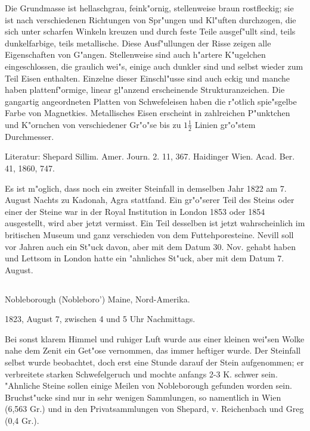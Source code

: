 \documentclass[a4paper, 11pt, oneside]{article}
\begin{document}
Die Grundmasse ist hellaschgrau, feink"ornig, stellenweise braun rostfleckig; sie ist nach verschiedenen Richtungen von Spr"ungen und Kl"uften durchzogen, die sich unter scharfen Winkeln kreuzen und durch feste Teile ausgef"ullt sind, teils dunkelfarbige, teils metallische. Diese Ausf"ullungen der Risse zeigen alle Eigenschaften von G"angen. Stellenweise sind auch h"artere K"ugelchen eingeschlossen, die graulich wei"s, einige auch dunkler sind und selbst wieder zum Teil Eisen enthalten. Einzelne dieser Einschl"usse sind auch eckig und manche haben plattenf"ormige, linear gl"anzend erscheinende Strukturanzeichen. Die gangartig angeordneten Platten von Schwefeleisen haben die r"otlich spie"sgelbe Farbe von Magnetkies. Metallisches Eisen erscheint in zahlreichen P"unktchen und K"ornchen von verschiedener Gr"o"se bis zu $\mathfrak{1\frac{1}{2}}$ Linien gr"o"stem Durchmesser.

\normalsize
Literatur: Shepard Sillim. Amer. Journ. 2. 11, 367. Haidinger Wien. Acad. Ber. 41, 1860, 747.

\LARGE
Es ist m"oglich, dass noch ein zweiter Steinfall in demselben Jahr 1822 am 7. August Nachts zu Kadonah, Agra stattfand. Ein gr"o"serer Teil des Steins oder einer der Steine war in der Royal Institution in London 1853 oder 1854 ausgestellt, wird aber jetzt vermisst. Ein Teil desselben ist jetzt wahrscheinlich im britischen Museum und ganz verschieden von dem Futtehporesteine. Nevill soll vor Jahren auch ein St"uck davon, aber mit dem Datum 30. Nov. gehabt haben und Lettsom in London hatte ein "ahnliches St"uck, aber mit dem Datum 7. August.
\subsection{}
\LARGE
\paragraph{}
Nobleborough (Nobleboro') Maine, Nord-Amerika.

1823, August 7, zwischen 4 und 5 Uhr Nachmittags.

Bei sonst klarem Himmel und ruhiger Luft wurde aus einer kleinen wei"sen Wolke nahe dem Zenit ein Get"ose vernommen, das immer heftiger wurde. Der Steinfall selbst wurde beobachtet, doch erst eine Stunde darauf der Stein aufgenommen; er verbreitete starken Schwefelgeruch und mochte anfangs 2-3 K. schwer sein. "Ahnliche Steine sollen einige Meilen von Nobleborough gefunden worden sein. Bruchst"ucke sind nur in sehr wenigen Sammlungen, so namentlich in Wien (6,563 Gr.) und in den Privatsammlungen von Shepard, v. Reichenbach und Greg (0,4 Gr.).
\end{document}

